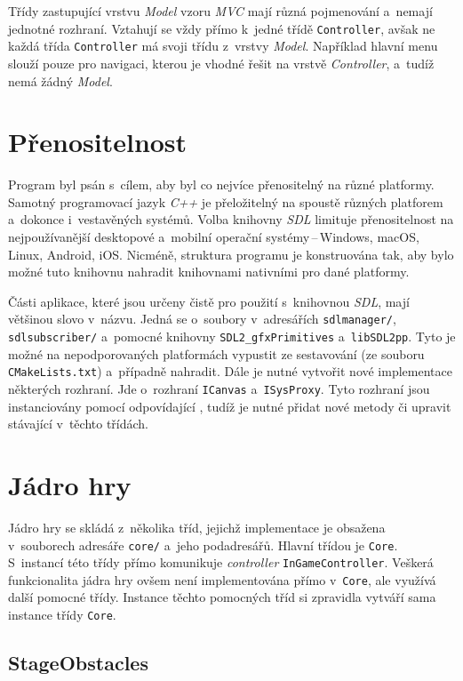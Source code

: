 Třídy zastupující vrstvu \emph{Model} vzoru \emph{MVC} mají různá pojmenování a~nemají jednotné rozhraní. Vztahují se vždy přímo k~jedné třídě \texttt{Controller}, avšak ne každá třída \texttt{Controller} má svoji třídu z~vrstvy \emph{Model}. Například hlavní menu slouží pouze pro navigaci, kterou je vhodné řešit na vrstvě \emph{Controller}, a~tudíž nemá žádný \emph{Model}.


\section{Přenositelnost}

Program byl psán s~cílem, aby byl co nejvíce přenositelný na různé platformy. Samotný programovací jazyk \emph{C++} je přeložitelný na spoustě různých platforem a~dokonce i~vestavěných systémů. Volba knihovny \emph{SDL} limituje přenositelnost na nejpoužívanější desktopové a~mobilní operační systémy\,--\,Windows, macOS, Linux, Android, iOS. Nicméně, struktura programu je konstruována tak, aby bylo možné tuto knihovnu nahradit knihovnami nativními pro dané platformy.

Části aplikace, které jsou určeny čistě pro použití s~knihovnou \emph{SDL}, mají většinou slovo  v~názvu. Jedná se o~soubory v~adresářích \texttt{sdlmanager/}, \texttt{sdlsubscriber/} a~pomocné knihovny \texttt{SDL2\_gfxPrimitives} a~\texttt{libSDL2pp}. Tyto je možné na nepodporovaných platformách vypustit ze sestavování (ze souboru \texttt{CMakeLists.txt}) a~případně nahradit. Dále je nutné vytvořit nové implementace některých rozhraní. Jde o~rozhraní \texttt{ICanvas} a~\texttt{ISysProxy}. Tyto rozhraní jsou instanciovány pomocí odpovídající , tudíž je nutné přidat nové metody či upravit stávající v~těchto třídách.


\section{Jádro hry}
\label{sec:jadro-hry}

Jádro hry se skládá z~několika tříd, jejichž implementace je obsažena v~souborech adresáře \texttt{core/} a~jeho podadresářů. Hlavní třídou je \texttt{Core}. S~instancí této třídy přímo komunikuje \emph{controller} \texttt{InGameController}. Veškerá funkcionalita jádra hry ovšem není implementována přímo v~\texttt{Core}, ale využívá další pomocné třídy. Instance těchto pomocných tříd si zpravidla vytváří sama instance třídy \texttt{Core}.

\subsection*{StageObstacles}

